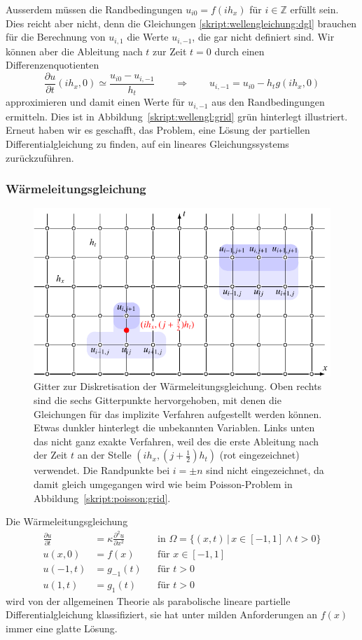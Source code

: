 Ausserdem müssen die Randbedingungen 
$u_{i0} = f(ih_x)$ für $i\in\mathbb Z$ erfüllt sein.
Dies reicht aber nicht, denn die Gleichungen
\eqref{skript:wellengleichung:dgl}
brauchen für die Berechnung von $u_{i,1}$ die Werte $u_{i,-1}$, die gar
nicht definiert sind.
Wir können aber die Ableitung nach $t$ zur Zeit $t=0$ durch einen
Differenzenquotienten
\[
\frac{\partial u}{\partial t}(ih_x,0)
\simeq
\frac{u_{i0}-u_{i,-1}}{h_t}
\qquad
\Rightarrow
\qquad
u_{i,-1} = u_{i0} -h_t g(ih_x,0)
\]
approximieren und damit einen Werte für $u_{i,-1}$ aus den Randbedingungen
ermitteln.
Dies ist in Abbildung~\ref{skript:wellengl:grid} grün hinterlegt illustriert.
Erneut haben wir es geschafft, das Problem, eine Lösung der partiellen
Differentialgleichung zu finden, auf ein lineares Gleichungssystems
zurückzuführen.

\subsubsection{Wärmeleitungsgleichung}
\begin{figure}
\centering
\includegraphics{chapters/2/waerme.pdf}
\caption{Gitter zur Diskretisation der Wärmeleitungsgleichung.
Oben rechts sind die sechs Gitterpunkte hervorgehoben, mit denen
die Gleichungen für das implizite Verfahren aufgestellt werden
können.
Etwas dunkler hinterlegt die unbekannten Variablen.
Links unten das nicht ganz exakte Verfahren, weil des die erste
Ableitung nach der Zeit $t$ an der Stelle $(ih_x,(j+\frac12)h_t)$
(rot eingezeichnet)
verwendet.
Die Randpunkte bei $i=\pm n$ sind nicht eingezeichnet, da damit gleich
umgegangen wird wie beim Poisson-Problem in Abbildung~\ref{skript:poisson:grid}.
\label{skript:waerme:grid}}
\end{figure}
Die Wärmeleitungsgleichung
\[
\begin{aligned}
\frac{\partial u}{\partial t}
&=
\kappa
\frac{\partial^2 u}{\partial x^2}
&&\text{in $\Omega = \{(x,t)\,|\, x\in[-1,1]\wedge t>0\}$}
\\
u(x,0)&=f(x)
&&\text{für $x\in[-1,1]$}
\\
u(-1,t)&=g_{-1}(t)
&&\text{für $t>0$}\\
u(1,t)&=g_{1}(t)
&&\text{für $t>0$}
\end{aligned}
\]
wird von der allgemeinen Theorie \cite{skript:pde} als parabolische
lineare partielle Differentialgleichung klassifiziert, sie hat
unter milden Anforderungen an $f(x)$ immer eine glatte Lösung.

